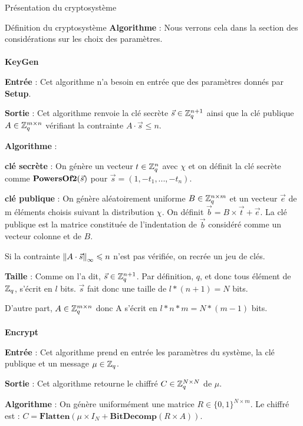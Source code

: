 \begin{section}{Présentation du cryptosystème}
\begin{subsection}{Définition du cryptosystème}
	\textbf{Algorithme} : Nous verrons cela dans la section des considérations sur les choix des paramètres.
	
	\paragraph{}
	\textbf{KeyGen}
	\flushleft
	
	\textbf{Entrée} : Cet algorithme n'a besoin en entrée que des paramètres donnés par \textbf{Setup}.

	\textbf{Sortie} : Cet algorithme renvoie la clé secrète $\vec{s} \in \mathbb{Z}_q^{n+1}$ ainsi que la clé publique $A \in \mathbb{Z}_q^{m \times n}$ vérifiant la contrainte $A \cdot \vec{s} \leqslant n$.

	\textbf{Algorithme} :

	\textbf{clé secrète} : On génère un vecteur $t \in \mathbb{Z}_q^n$ avec $\chi$ et on définit la clé secrète comme $\text{\textbf{PowersOf2}}(\vec{s})$ pour $\vec{s} = (1, -t_1, ..., -t_n)$.

	\textbf{clé publique} : On génère aléatoirement uniforme $B \in \mathbb{Z}_q^{n \times m}$ et un vecteur $\vec{e}$ de m éléments choisis suivant la distribution $\chi$. On définit $\vec{b} = B \times \vec{t} + \vec{e}$. La clé publique est la matrice constituée de l'indentation de $\vec{b}$ considéré comme un vecteur colonne et de $B$.

	Si la contrainte ${\|A \cdot \vec{s}\|}_{\infty} \leqslant n$ n'est pas vérifiée, on recrée un jeu de clés.

	\textbf{Taille} : Comme on l'a dit, $\vec{s} \in \mathbb{Z}_q^{n+1}$. Par définition, $q$, et donc tous élément de $\mathbb{Z}_q$, s'écrit en $l$ bits. $\vec{s}$ fait donc une taille de $l * (n+1) = N$ bits.

	D'autre part, $A \in \mathbb{Z}_q^{m \times n}$ donc A s'écrit en $l * n * m = N * (m - 1)$ bits.
	
	\paragraph{}
	\textbf{Encrypt}
	\flushleft
	
	\textbf{Entrée} : Cet algorithme prend en entrée les paramètres du système, la clé publique et un message $\mu \in \mathbb{Z}_q$.

	\textbf{Sortie} : Cet algorithme retourne le chiffré $C \in \mathbb{Z}_q^{N \times N}$ de $\mu$.

	\textbf{Algorithme} : On génère uniformément une matrice $R \in \{ 0,1\} ^{N \times m}$. Le chiffré est : $C = \textbf{Flatten}(\mu \times I_N + \textbf{BitDecomp}(R \times A))$.


\end{subsection}
\end{section}
